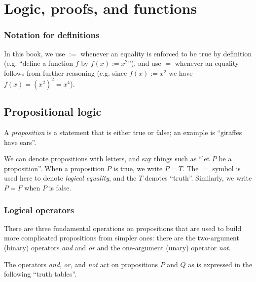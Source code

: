 \chapter{Logic, proofs, and functions}
\label{ch::logic_pf_fns}

\subsection*{Notation for definitions}

In this book, we use $:=$ whenever an equality is enforced to be true by definition (e.g. ``define a function $f$ by $f(x) := x^2$''), and use $=$ whenever an equality follows from further reasoning (e.g. since $f(x) := x^2$ we have $f(x) = (x^2)^2 = x^4$).

\section{Propositional logic}

A \textit{proposition} is a statement that is either true or false; an example is ``giraffes have ears''.

We can denote propositions with letters, and say things such as ``let $P$ be a proposition''. When a proposition $P$ is true, we write $P = T$. The $=$ symbol is used here to denote \textit{logical equality}, and the $T$ denotes ``truth''. Similarly, we write $P = F$ when $P$ is false.

\subsection*{Logical operators}

There are three fundamental operations on propositions that are used to build more complicated propositions from simpler ones: there are the two-argument (binary) operators \textit{and} and \textit{or} and the one-argument (unary) operator \textit{not}.

The operators \textit{and}, \textit{or}, and \textit{not} act on propositions $P$ and $Q$ as is expressed in the following ``truth tables''.

